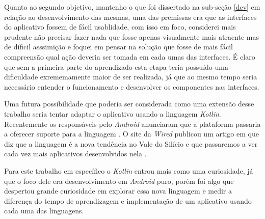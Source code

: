 \documentclass[hidelinks,12pt]{article}
\begin{document}
Quanto ao segundo objetivo, mantenho o que foi dissertado na sub-se\c{c}\~ao \ref{dev} em rela\c{c}\~ao ao desenvolvimento das mesmas, uma das premissas era que as interfaces do aplicativo fossem de f\'acil usablidade, com isso em foco, considerei mais prudente n\~ao precisar fazer nada que fosse apenas visualmente mais atraente mas de d\'ificil asssimi\c{c}\~ao e foquei em pensar na solu\c{c}\~ao que fosse de mais f\'acil compreens\~ao qual a\c{c}\~ao deveria ser tomada em cada umas das interfaces. É claro que sem a primeira parte do aprendizado esta etapa teria possu\'ido uma dificuldade exrememamente maior de ser realizada, j\'a que ao mesmo tempo seria necess\'ario entender o funcionamento e desenvolver os componentes nas interfaces.

Uma futura possibilidade que poderia ser considerada como uma extens\~ao desse trabalho seria tentar adaptar o aplicativo usando a linguagem \textit{Kotlin}. Recentemente os respons\'aveis pelo \textit{Android} anunciaram que a plataforma passaria a oferecer suporte para a linguagem \cite{kotlin:and_adopt}. O site da \textit{Wired} publicou um artigo em que diz que a linguagem \'e a nova tendência no Vale do Sil\'icio e que passaremos a ver cada vez mais aplicativos desenvolvidos nela \cite{kotlin:wired}.

Para este trabalho em espec\'ifico o \textit{Kotlin} entrou mais como uma curiosidade, j\'a que o foco dele era desenvolvimento em \textit{Android} puro, por\'em foi algo que despertou grande curiosidade em explorar essa nova linguagem e medir a diferen\c{c}a do tempo de aprendizagem e implementa\c{c}\~ao de um aplicativo usando cada uma das linguagens.
\newpage
\end{document}
